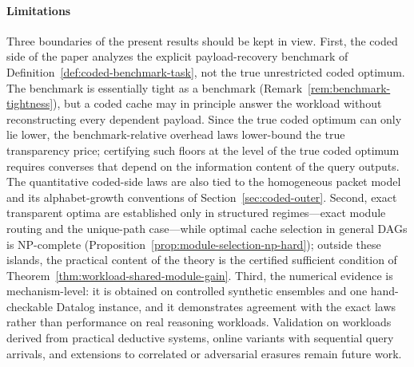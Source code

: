 \documentclass[journal]{IEEEtran}
\numberwithin{equation}{section}
\begin{document}
\paragraph{Limitations}
\label{para:discussion-limitations}
Three boundaries of the present results should be kept in view.  First, the
coded side of the paper analyzes the explicit payload-recovery benchmark of
Definition~\ref{def:coded-benchmark-task}, not the true unrestricted coded
optimum.  The benchmark is essentially tight as a benchmark
(Remark~\ref{rem:benchmark-tightness}), but a coded cache may in principle
answer the workload without reconstructing every dependent payload.  Since
the true coded optimum can only lie lower, the benchmark-relative overhead
laws lower-bound the true transparency price; certifying such floors at the
level of the true coded optimum requires converses that depend on the
information content of the query outputs.  The quantitative coded-side
laws are also tied to the homogeneous packet model and its alphabet-growth
conventions of Section~\ref{sec:coded-outer}.  Second, exact transparent
optima are established only in structured regimes---exact module routing
and the unique-path case---while optimal cache selection in general DAGs is
NP-complete (Proposition~\ref{prop:module-selection-np-hard}); outside
these islands, the practical content of the theory is the certified
sufficient condition of
Theorem~\ref{thm:workload-shared-module-gain}.  Third, the numerical
evidence is mechanism-level: it is obtained on controlled synthetic
ensembles and one hand-checkable Datalog instance, and it demonstrates
agreement with the exact laws rather than performance on real reasoning
workloads.  Validation on workloads derived from practical deductive
systems, online variants with sequential query arrivals, and extensions to
correlated or adversarial erasures remain future work.
\end{document}
